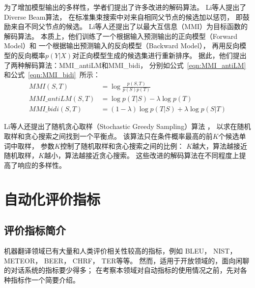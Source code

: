为了增加模型输出的多样性，学者们提出了许多改进的解码算法。
Li等人提出了Diverse Beam算法，
在标准集束搜索中对来自相同父节点的候选加以惩罚，
即鼓励来自不同父节点的候选。
Li等人还提出了以最大互信息（MMI）为目标函数的解码算法。
本质上，他们训练了一个根据输入预测输出的正向模型（Forward Model）和
一个根据输出预测输入的反向模型（Backward Model），
再用反向模型的反向概率$p(Y|X)$对正向模型生成的候选集进行重新排序。
据此，他们提出了两种解码算法：MMI\_antiLM和MMI\_bidi，
分别如公式~\ref{eqn:MMI_antiLM}和公式~\ref{eqn:MMI_bidi}~所示：
\begin{align}
    MMI(S, T) &= \log \frac{p(S, T)}{p(S)p(T)} \label{eqn:MMI} \\
    \textit{MMI\_antiLM}(S, T) &= \log p(T|S) - \lambda \log p(T) \label{eqn:MMI_antiLM} \\
    \textit{MMI\_bidi}(S, T) &= (1 - \lambda) \log p(T|S) + \lambda \log p(S|T) \label{eqn:MMI_bidi}
\end{align}

Li等人还提出了随机贪心取样（Stochastic Greedy Sampling）算法
，
以求在随机取样和贪心搜索之间找到一个平衡点。
该算法只在条件概率最高的前$K$个候选单词中取样，
参数$K$控制了随机取样和贪心搜索之间的比例：
$K$越大，算法越接近随机取样，$K$越小，算法越接近贪心搜索。
这些改进的解码算法在不同程度上提高了响应的多样性。

\section{自动化评价指标}\label{sec:automatic_metric}
\subsection{评价指标简介}\label{subsec:metrics_intro}
机器翻译领域已有大量和人类评价相关性较高的指标，例如
BLEU，
NIST，
METEOR，
BEER，
CHRF，
TER等等。
然而，适用于开放领域的，面向闲聊的对话系统的指标要少得多；
在考察本领域对自动指标的使用情况之前，先对各种指标作一个简要介绍。

